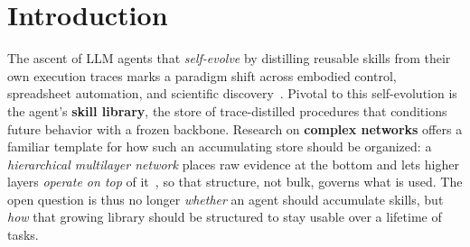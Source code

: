 \section{Introduction}
\label{sec:intro}


The ascent of LLM agents that \emph{self-evolve} by distilling reusable skills from their own execution traces marks a paradigm shift across embodied control, spreadsheet automation, and scientific discovery~\citep{trace2skill,skillopt,skillbrew,evoskill,gmemory,memoryos,skillos_ouyang}.
Pivotal to this self-evolution is the agent's \textbf{skill library}, the store of trace-distilled procedures that conditions future behavior with a frozen backbone.
Research on \textbf{complex networks} offers a familiar template for how such an accumulating store should be organized: a \emph{hierarchical multilayer network} places raw evidence at the bottom and lets higher layers \emph{operate on top} of it~\citep{boccaletti2014multilayer}, so that structure, not bulk, governs what is used.
The open question is thus no longer \emph{whether} an agent should accumulate skills, but \emph{how} that growing library should be structured to stay usable over a lifetime of tasks.

